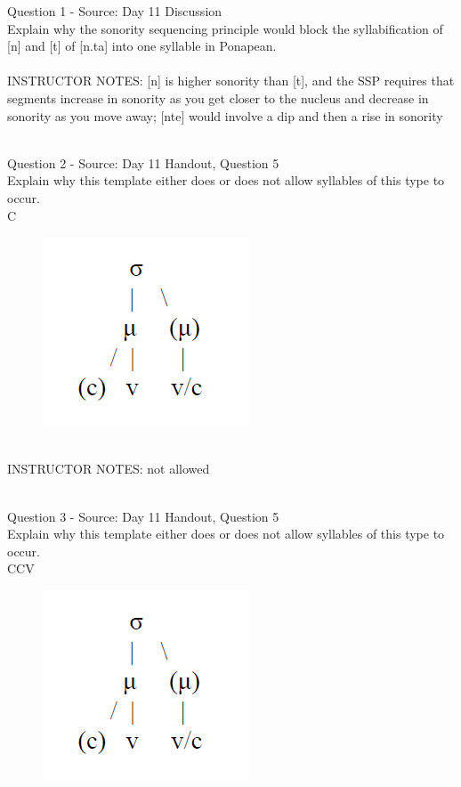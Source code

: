 \documentclass[12pt]{article}
\begin{document}
{\large Question 1} - Source: Day 11 Discussion\\

Explain why the sonority sequencing principle would block the syllabification of [n] and [t] of [n.ta] into one syllable in Ponapean.\\


~\\
INSTRUCTOR NOTES: [n] is higher sonority than [t], and the SSP requires that segments increase in sonority as you get closer to the nucleus and decrease in sonority as you move away; [nte] would involve a dip and then a rise in sonority


~\\

{\large Question 2} - Source: Day 11 Handout, Question 5\\

Explain why this template either does or does not allow syllables of this type to occur.\\

C

\begin{figure}[H]
\includegraphics{../images/ponapean_syllabletemplate.png}
\end{figure}

~\\
INSTRUCTOR NOTES: not allowed


~\\

{\large Question 3} - Source: Day 11 Handout, Question 5\\

Explain why this template either does or does not allow syllables of this type to occur.\\

CCV

\begin{figure}[H]
\includegraphics{../images/ponapean_syllabletemplate.png}
\end{figure}
\end{document}
